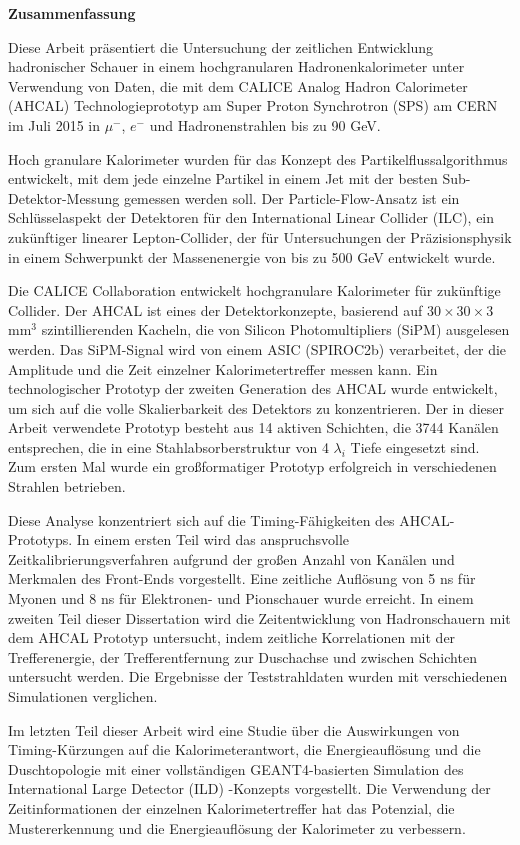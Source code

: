 \newpage
\thispagestyle{empty}
\begin{center}
{\bf Zusammenfassung}
\end{center}

Diese Arbeit präsentiert die Untersuchung der zeitlichen Entwicklung hadronischer Schauer in einem hochgranularen Hadronenkalorimeter unter Verwendung von Daten, die mit dem CALICE Analog Hadron Calorimeter (AHCAL) Technologieprototyp am Super Proton Synchrotron (SPS) am CERN im Juli 2015 in $\mu^- $, $e^-$ und Hadronenstrahlen bis zu 90 GeV.

Hoch granulare Kalorimeter wurden für das Konzept des Partikelflussalgorithmus entwickelt, mit dem jede einzelne Partikel in einem Jet mit der besten Sub-Detektor-Messung gemessen werden soll. Der Particle-Flow-Ansatz ist ein Schlüsselaspekt der Detektoren für den International Linear Collider (ILC), ein zukünftiger linearer Lepton-Collider, der für Untersuchungen der Präzisionsphysik in einem Schwerpunkt der Massenenergie von bis zu 500 GeV entwickelt wurde.

Die CALICE Collaboration entwickelt hochgranulare Kalorimeter für zukünftige Collider. Der AHCAL ist eines der Detektorkonzepte, basierend auf $30\times30\times3$ mm$^3$ szintillierenden Kacheln, die von Silicon Photomultipliers (SiPM) ausgelesen werden. Das SiPM-Signal wird von einem ASIC (SPIROC2b) verarbeitet, der die Amplitude und die Zeit einzelner Kalorimetertreffer messen kann. Ein technologischer Prototyp der zweiten Generation des AHCAL wurde entwickelt, um sich auf die volle Skalierbarkeit des Detektors zu konzentrieren. Der in dieser Arbeit verwendete Prototyp besteht aus 14 aktiven Schichten, die 3744 Kanälen entsprechen, die in eine Stahlabsorberstruktur von 4 $\lambda_i$ Tiefe eingesetzt sind. Zum ersten Mal wurde ein großformatiger Prototyp erfolgreich in verschiedenen Strahlen betrieben.

Diese Analyse konzentriert sich auf die Timing-Fähigkeiten des AHCAL-Prototyps. In einem ersten Teil wird das anspruchsvolle Zeitkalibrierungsverfahren aufgrund der großen Anzahl von Kanälen und Merkmalen des Front-Ends vorgestellt. Eine zeitliche Auflösung von 5 ns für Myonen und 8 ns für Elektronen- und Pionschauer wurde erreicht. In einem zweiten Teil dieser Dissertation wird die Zeitentwicklung von Hadronschauern mit dem AHCAL Prototyp untersucht, indem zeitliche Korrelationen mit der Trefferenergie, der Trefferentfernung zur Duschachse und zwischen Schichten untersucht werden. Die Ergebnisse der Teststrahldaten wurden mit verschiedenen Simulationen verglichen.

Im letzten Teil dieser Arbeit wird eine Studie über die Auswirkungen von Timing-Kürzungen auf die Kalorimeterantwort, die Energieauflösung und die Duschtopologie mit einer vollständigen GEANT4-basierten Simulation des International Large Detector (ILD) -Konzepts vorgestellt. Die Verwendung der Zeitinformationen der einzelnen Kalorimetertreffer hat das Potenzial, die Mustererkennung und die Energieauflösung der Kalorimeter zu verbessern.

